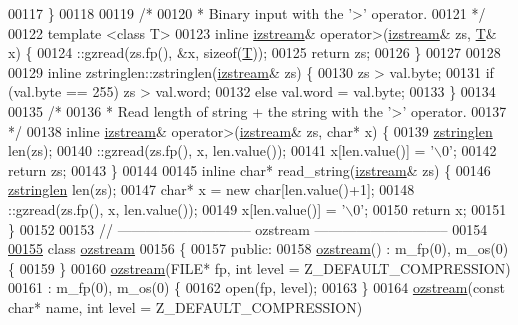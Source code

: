 \begin{DoxyCode}
00117 \}
00118 
00119 \textcolor{comment}{/*}
00120 \textcolor{comment}{ * Binary input with the '>' operator.}
00121 \textcolor{comment}{ */}
00122 \textcolor{keyword}{template} <\textcolor{keyword}{class} T>
00123 \textcolor{keyword}{inline} \hyperlink{classizstream}{izstream}& operator>(\hyperlink{classizstream}{izstream}& zs, \hyperlink{group___sparse_core___module}{T}& x) \{
00124     ::gzread(zs.fp(), &x, \textcolor{keyword}{sizeof}(\hyperlink{group___sparse_core___module}{T}));
00125     \textcolor{keywordflow}{return} zs;
00126 \}
00127 
00128 
00129 \textcolor{keyword}{inline} zstringlen::zstringlen(\hyperlink{classizstream}{izstream}& zs) \{
00130     zs > val.byte;
00131     \textcolor{keywordflow}{if} (val.byte == 255) zs > val.word;
00132     \textcolor{keywordflow}{else} val.word = val.byte;
00133 \}
00134 
00135 \textcolor{comment}{/*}
00136 \textcolor{comment}{ * Read length of string + the string with the '>' operator.}
00137 \textcolor{comment}{ */}
00138 \textcolor{keyword}{inline} \hyperlink{classizstream}{izstream}& operator>(\hyperlink{classizstream}{izstream}& zs, \textcolor{keywordtype}{char}* x) \{
00139     \hyperlink{classzstringlen}{zstringlen} len(zs);
00140     ::gzread(zs.fp(), x, len.value());
00141     x[len.value()] = \textcolor{charliteral}{'\(\backslash\)0'};
00142     \textcolor{keywordflow}{return} zs;
00143 \}
00144 
00145 \textcolor{keyword}{inline} \textcolor{keywordtype}{char}* read\_string(\hyperlink{classizstream}{izstream}& zs) \{
00146     \hyperlink{classzstringlen}{zstringlen} len(zs);
00147     \textcolor{keywordtype}{char}* x = \textcolor{keyword}{new} \textcolor{keywordtype}{char}[len.value()+1];
00148     ::gzread(zs.fp(), x, len.value());
00149     x[len.value()] = \textcolor{charliteral}{'\(\backslash\)0'};
00150     \textcolor{keywordflow}{return} x;
00151 \}
00152 
00153 \textcolor{comment}{// ----------------------------- ozstream -----------------------------}
00154 
\hyperlink{classozstream}{00155} \textcolor{keyword}{class }\hyperlink{classozstream}{ozstream}
00156 \{
00157     \textcolor{keyword}{public}:
00158         \hyperlink{classozstream}{ozstream}() : m\_fp(0), m\_os(0) \{
00159         \}
00160         \hyperlink{classozstream}{ozstream}(FILE* fp, \textcolor{keywordtype}{int} level = Z\_DEFAULT\_COMPRESSION)
00161             : m\_fp(0), m\_os(0) \{
00162             open(fp, level);
00163         \}
00164         \hyperlink{classozstream}{ozstream}(\textcolor{keyword}{const} \textcolor{keywordtype}{char}* name, \textcolor{keywordtype}{int} level = Z\_DEFAULT\_COMPRESSION)

\end{DoxyCode}
